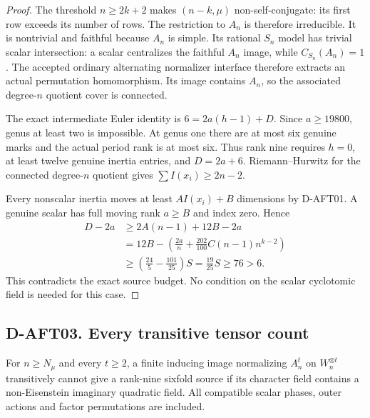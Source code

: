 \begin{proof}
The threshold $n\ge2k+2$ makes $(n-k,\mu)$ non-self-conjugate:
its first row exceeds its number of rows. The restriction
to $A_n$ is therefore irreducible. It is nontrivial and
faithful because $A_n$ is simple. Its rational $S_n$ model
has trivial scalar intersection: a scalar centralizes the
faithful $A_n$ image, while $C_{S_n}(A_n)=1$.
The accepted ordinary alternating normalizer interface
therefore extracts an actual permutation homomorphism.
Its image contains $A_n$, so the associated degree-$n$
quotient cover is connected.

The exact intermediate Euler identity is
$6=2a(h-1)+D$. Since $a\ge19800$, genus at least two is
impossible. At genus one there are at most six genuine
marks and the actual period rank is at most six. Thus
rank nine requires $h=0$, at least twelve genuine inertia
entries, and $D=2a+6$. Riemann--Hurwitz for the connected
degree-$n$ quotient gives $\sum I(x_i)\ge2n-2$.

Every nonscalar inertia moves at least $AI(x_i)+B$
dimensions by D-AFT01. A genuine scalar has full moving
rank $a\ge B$ and index zero. Hence
\[
 \begin{split}
 D-2a&\ge2A(n-1)+12B-2a\\
     &=12B-\left(\frac{2a}{n}
             +\frac{202}{100}C(n-1)n^{k-2}\right)\\
     &\ge\left(\frac{24}{5}-\frac{101}{25}\right)S
       =\frac{19}{25}S\ge76>6.
 \end{split}                                           \tag{AFT.16}
\]
This contradicts the exact source budget. No condition on
the scalar cyclotomic field is needed for this case.
\end{proof}

\subsection*{D-AFT03. Every transitive tensor count}

\begin{theorem}[D-AFT03]
For $n\ge N_\mu$ and every $t\ge2$, a finite inducing
image normalizing $A_n^t$ on $W_n^{\otimes t}$ transitively
cannot give a rank-nine sixfold source if its character
field contains a non-Eisenstein imaginary quadratic field.
All compatible scalar phases, outer actions and factor
permutations are included.
\end{theorem}

